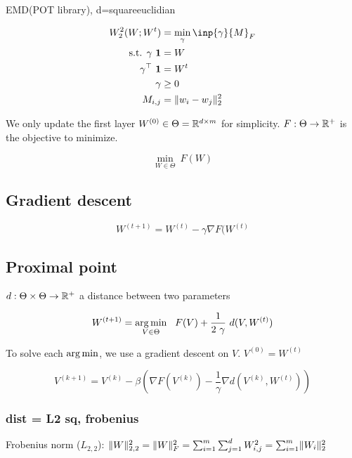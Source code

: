 EMD(POT library), d=squareeuclidian

\begin{align}
	W_2^2(W; W^t) &= \min_{\gamma} \inp{\gamma}{M}_F \\
	\text{s.t.  } \gamma ~ \mathbf{1} &= W \\
	\gamma^\top ~ \mathbf{1} &= W^t \\
	\gamma &\geq 0 \\
	M_{i, j} &= \lVert w_i - w_j \rVert^2_2
\end{align}

We only update the first layer $W^{(0)} \in \Theta = \mathbb{R}^{d \times m}$ for simplicity. $F : \Theta \rightarrow \mathbb{R}^+$ is the objective to minimize.

\begin{equation}
	\min_{W \in \Theta} \ F(W)
\end{equation}

\subsection{Gradient descent}

\begin{equation}
	W^{(t+1)} = W^{(t)} - \gamma \nabla F(W^{(t)}
\end{equation}

\subsection{Proximal point}

$d: \Theta \times \Theta \rightarrow \mathbb{R}^+$ a distance between two parameters

\begin{equation}
	W^{(t+1)} = \argmin_{V \in \Theta} \ \  F(V) + \frac{1}{2 ~ \gamma} ~ d(V, W^{(t)})
\end{equation}

To solve each $\operatorname*{arg\,min}$, we use a gradient descent on $V$. $V^{(0)} = W^{(t)}$

\begin{equation}
	V^{(k+1)} = V^{(k)} - \beta \left(\nabla F(V^{(k)}) - \frac{1}{\gamma} \nabla d(V^{(k)}, W^{(t)})\right)
\end{equation}

\subsubsection{dist = L2 sq, frobenius}

Frobenius norm ($L_{2,2}$): $\lVert W\rVert_{2,2}^2 = \lVert W\rVert_F^2 = \sum_{i=1}^{m} \sum_{j=1}^{d} W_{i, j}^2 = \sum_{i=1}^{m} \lVert W_i\rVert_2^2$


